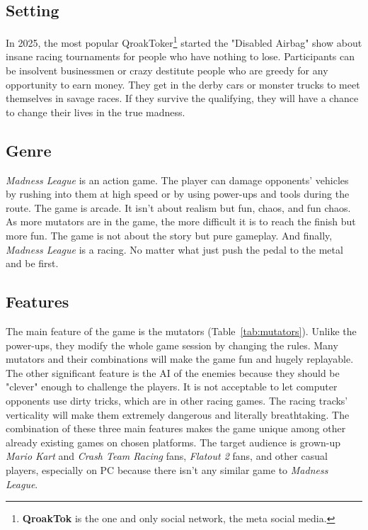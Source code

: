 \documentclass[a4paper,10pt,english]{article}
\begin{document}
\subsection*{Setting}
In 2025, the most popular QroakToker\footnote{\textbf{QroakTok} is the one and only social network, the meta social media.} started the "Disabled Airbag" show about insane racing tournaments for people who have nothing to lose.
Participants can be insolvent businessmen or crazy destitute people who are greedy for any opportunity to earn money. They get in the derby cars or monster trucks to meet themselves in savage races.
If they survive the qualifying, they will have a chance to change their lives in the true madness.

\subsection*{Genre}
\emph{Madness League} is an action game.
The player can damage opponents' vehicles by rushing into them at high speed or by using power-ups and tools during the route.
The game is arcade. It isn't about realism but fun, chaos, and fun chaos.
As more mutators are in the game, the more difficult it is to reach the finish but more fun.
The game is not about the story but pure gameplay.
And finally, \emph{Madness League} is a racing.
No matter what just push the pedal to the metal and be first.

\subsection*{Features}
The main feature of the game is the mutators (Table~\ref{tab:mutators}).
Unlike the power-ups, they modify the whole game session by changing the rules.
Many mutators and their combinations will make the game fun and hugely replayable.
The other significant feature is the AI of the enemies because they should be "clever" enough to challenge the players.
It is not acceptable to let computer opponents use dirty tricks, which are in other racing games.
The racing tracks' verticality will make them extremely dangerous and literally breathtaking.
The combination of these three main features makes the game unique among other already existing games on chosen platforms.
The target audience is grown-up \emph{Mario Kart} and \emph{Crash Team Racing} fans, \emph{Flatout 2} fans, and other casual players, especially on PC because there isn't any similar game to \emph{Madness League}.
\end{document}
